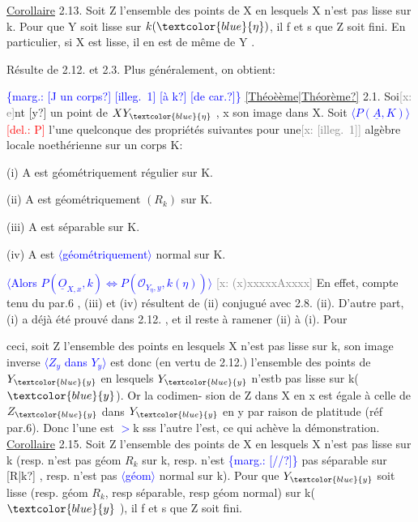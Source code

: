 \documentclass[11pt]{article}
\newcommand{\scanpage}[1]{\par\bigskip\noindent{\small\sffamily[scan #1]}\par}
\newcommand{\mspage}[1]{{\small\sffamily[p.\,#1]}}
\newcommand{\hand}[1]{\textcolor{blue}{#1}}
\let\over\relax
\newcommand{\over}[2]{\textcolor{gray}{#1}\textcolor{blue}{\ensuremath{^{\!\nearrow}}#2}}
\newcommand{\inserted}[2][]{\textcolor{blue}{$\langle$#2$\rangle$}}
\newcommand{\margin}[1]{\textcolor{blue}{\{\textsf{marg.:} #1\}}}
\newcommand{\deleted}[1]{\textcolor{red}{[\textsf{del.:} #1]}}
\newcommand{\xout}[1]{\textcolor{gray}{[\textsf{x:} #1]}}
\newcommand{\uline}[1]{\underline{#1}}
\newcommand{\unsure}[1]{[#1?]}
\newcommand{\illegible}[1]{[\textsf{illeg.\ #1}]}
\begin{document}
\uline{Corollaire} 2.13. Soit Z l'ensemble des points de X en lesquels X
n'est pas lisse sur k. Pour que Y soit lisse sur $k(\hand{\eta})$, il f et s
que Z soit fini. En particulier, si X est lisse, il en est de même de
Y .

Résulte de 2.12. et 2.3. Plus généralement, on obtient:

\margin{\unsure{J un corps} \illegible{1} \unsure{à k} \unsure{de car.}}
\uline{\unsure{Théoèème|Théorème}} 2.1\over{3}{4}. Soi\xout{e}nt \unsure{y} un point de $\over{X}{Y}_{\hand{\eta}}$ , x son image dans X. Soit
\inserted[typed]{$P(\underline{A},K)$} \deleted{P} l'une quelconque des propriétés suivantes pour une\xout{\illegible{1}} algèbre
locale noethérienne sur un corps K:

(i) A est géométriquement régulier sur K.

(ii) A est géométriquement $(R_k)$ sur K.

(iii) A est séparable sur K.

(iv) A est \inserted{géométriquement} normal sur K.

\inserted{Alors $P(\underline{O}_{X,x}, k) \Longleftrightarrow P(\mathcal{O}_{Y_\eta,y}, k(\eta))$}
\xout{(x)xxxxxAxxxx} En effet, compte tenu du par.6 , (iii) et (iv)
résultent de (ii) conjugué avec 2.8. (ii). D'autre part, (i)
a déjà été prouvé dans 2.12. , et il reste à ramener (ii) à (i). Pour

\mspage{\hand{13}}

\clearpage
\scanpage{25/14}
\mspage{\hand{11}}

ceci, soit Z l'ensemble des points en lesquels X n'est pas lisse sur
k, son image inverse \inserted{$Z_{y}$ dans $Y_{y}$} est donc (en vertu de 2.12.)   l'ensemble des
points de $Y_{\hand{y}}$ en lesquels $Y_{\hand{y}}$ n'estb pas lisse sur k($\hand{y}$). Or  la codimen-%
sion de  Z dans X en x  est égale à celle de  $Z_{\hand{y}}$ dans $Y_{\hand{y}}$  en y par
raison de platitude (réf par.6). Donc l'une est \hand{$>$}k  sss l'autre l'est,
ce qui achève la démonstration.
\uline{Corollaire} 2.15.   Soit Z l'ensemble des points de X en lesquels
X n'est pas lisse sur k (resp. n'est pas  géom $R_k$ sur k, resp. n'est
\margin{\unsure{//}} pas séparable sur \unsure{R|k} , resp. n'est pas \inserted{géom} normal sur k). Pour que $Y_{\hand{y}}$ soit
lisse (resp.  géom $R_k$, resp séparable, resp géom normal) sur k($\hand{y}$ ), il
f et s  que Z soit fini.
\end{document}
